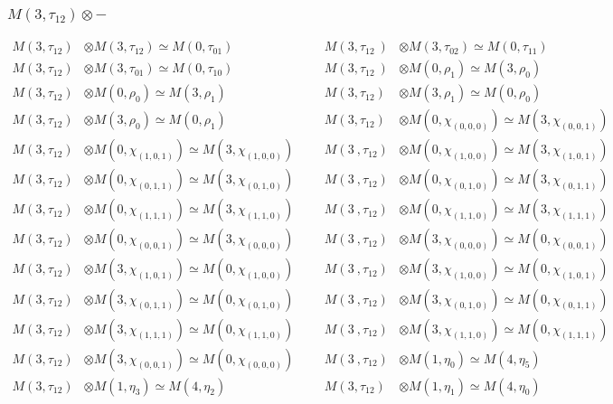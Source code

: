 \subsubsection{$M(3,\tau_{12})\otimes -$}
\begin{align*}
M(3,\tau_{12}) &\otimes M(3,\tau_{12}) \simeq M(0,\tau_{01}) &&& M(3,\tau_{12}\
) &\otimes M(3,\tau_{02}) \simeq M(0,\tau_{11})\\
M(3,\tau_{12}) &\otimes M(3,\tau_{01}) \simeq M(0,\tau_{10}) &&& M(3,\tau_{12}\
) &\otimes M(0,\rho_{1}) \simeq M(3,\rho_{0})\\
M(3,\tau_{12}) &\otimes M(0,\rho_{0}) \simeq M(3,\rho_{1}) &&& M(3,\tau_{12}) \
&\otimes M(3,\rho_{1}) \simeq M(0,\rho_{0})\\
M(3,\tau_{12}) &\otimes M(3,\rho_{0}) \simeq M(0,\rho_{1}) &&& M(3,\tau_{12}) \
&\otimes M(0,\chi_{(0,0,0)}) \simeq M(3,\chi_{(0,0,1)})\\
M(3,\tau_{12}) &\otimes M(0,\chi_{(1,0,1)}) \simeq M(3,\chi_{(1,0,0)}) &&& M(3\
,\tau_{12}) &\otimes M(0,\chi_{(1,0,0)}) \simeq M(3,\chi_{(1,0,1)})\\
M(3,\tau_{12}) &\otimes M(0,\chi_{(0,1,1)}) \simeq M(3,\chi_{(0,1,0)}) &&& M(3\
,\tau_{12}) &\otimes M(0,\chi_{(0,1,0)}) \simeq M(3,\chi_{(0,1,1)})\\
M(3,\tau_{12}) &\otimes M(0,\chi_{(1,1,1)}) \simeq M(3,\chi_{(1,1,0)}) &&& M(3\
,\tau_{12}) &\otimes M(0,\chi_{(1,1,0)}) \simeq M(3,\chi_{(1,1,1)})\\
M(3,\tau_{12}) &\otimes M(0,\chi_{(0,0,1)}) \simeq M(3,\chi_{(0,0,0)}) &&& M(3\
,\tau_{12}) &\otimes M(3,\chi_{(0,0,0)}) \simeq M(0,\chi_{(0,0,1)})\\
M(3,\tau_{12}) &\otimes M(3,\chi_{(1,0,1)}) \simeq M(0,\chi_{(1,0,0)}) &&& M(3\
,\tau_{12}) &\otimes M(3,\chi_{(1,0,0)}) \simeq M(0,\chi_{(1,0,1)})\\
M(3,\tau_{12}) &\otimes M(3,\chi_{(0,1,1)}) \simeq M(0,\chi_{(0,1,0)}) &&& M(3\
,\tau_{12}) &\otimes M(3,\chi_{(0,1,0)}) \simeq M(0,\chi_{(0,1,1)})\\
M(3,\tau_{12}) &\otimes M(3,\chi_{(1,1,1)}) \simeq M(0,\chi_{(1,1,0)}) &&& M(3\
,\tau_{12}) &\otimes M(3,\chi_{(1,1,0)}) \simeq M(0,\chi_{(1,1,1)})\\
M(3,\tau_{12}) &\otimes M(3,\chi_{(0,0,1)}) \simeq M(0,\chi_{(0,0,0)}) &&& M(3\
,\tau_{12}) &\otimes M(1,\eta_{0}) \simeq M(4,\eta_{5})\\
M(3,\tau_{12}) &\otimes M(1,\eta_{3}) \simeq M(4,\eta_{2}) &&& M(3,\tau_{12}) \
&\otimes M(1,\eta_{1}) \simeq M(4,\eta_{0})\\

\end{align*}
